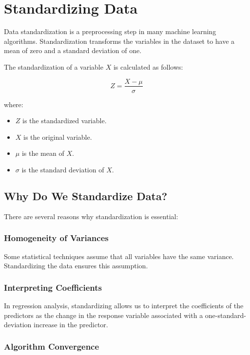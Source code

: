 \chapter{Standardizing Data}


Data standardization is a preprocessing step in many machine learning algorithms. Standardization transforms the variables in the dataset to have a mean of zero and a standard deviation of one.

The standardization of a variable $X$ is calculated as follows:

\begin{equation}
Z = \frac{X - \mu}{\sigma}
\end{equation}

where:
\begin{itemize}
\item $Z$ is the standardized variable.
\item $X$ is the original variable.
\item $\mu$ is the mean of $X$.
\item $\sigma$ is the standard deviation of $X$.
\end{itemize}

\section{Why Do We Standardize Data?}

There are several reasons why standardization is essential:

\subsection{Homogeneity of Variances}

Some statistical techniques assume that all variables have the same variance. Standardizing the data ensures this assumption.

\subsection{Interpreting Coefficients}

In regression analysis, standardizing allows us to interpret the coefficients of the predictors as the change in the response variable associated with a one-standard-deviation increase in the predictor.

\subsection{Algorithm Convergence}

